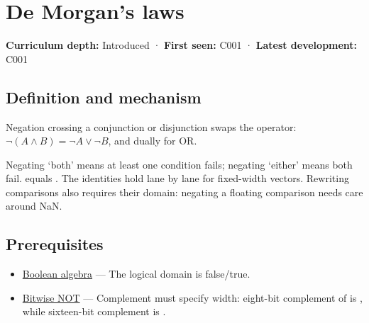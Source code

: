 \hypertarget{appendix-9079d3659da4}{}\label{referencestart:appendix-9079d3659da4}
\section{De Morgan's laws}\label{appendix-9079d3659da4-de-morgans-laws}

\hypertarget{appendix-9079d3659da4-de-morgans-laws}{}

\textbf{Curriculum depth:} Introduced · \textbf{First seen:} C001 · \textbf{Latest development:} C001

\begin{allmightroledefinition}

\subsection{Definition and mechanism}\label{appendix-9079d3659da4-definition-and-mechanism}

\hypertarget{appendix-9079d3659da4-definition-and-mechanism}{}

Negation crossing a conjunction or disjunction swaps the operator: \(\neg(A\land B)=\neg A\lor\neg B\), and dually for OR.

\end{allmightroledefinition}

Negating `both' means at least one condition fails; negating `either' means both fail.  equals . The identities hold lane by lane for fixed-width vectors. Rewriting comparisons also requires their domain: negating a floating comparison needs care around NaN.

\subsection{Prerequisites}\label{appendix-9079d3659da4-prerequisites}

\hypertarget{appendix-9079d3659da4-prerequisites}{}

\begin{itemize}
\tightlist
\item
  \hyperref[appendix-24475e1596a8]{Boolean algebra} --- The logical domain is false/true.
\item
  \hyperref[appendix-8f38927cfc54]{Bitwise NOT} --- Complement must specify width: eight-bit complement of  is , while sixteen-bit complement is .
\end{itemize}


